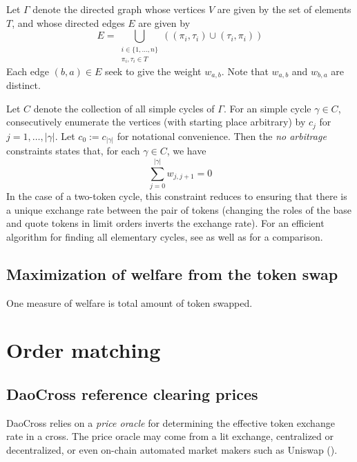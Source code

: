 \documentclass[11pt, reqno]{amsart}
\theoremstyle{definition}
\theoremstyle{remark}
\begin{document}
Let $\Gamma$ denote the directed graph whose vertices $V$ are given by the set
of elements $T$, and whose directed edges $E$ are given by
\[
    E = \bigcup_{\substack{i \in \{1, \ldots, n\} \\ \pi_i, \tau_i \in T}}
    \left( (\pi_i, \tau_i) \cup (\tau_i, \pi_i) \right)
\]
Each edge $(b, a) \in E$ seek to give the weight $w_{a, b}$. Note that
$w_{a, b}$ and $w_{b, a}$ are distinct.

Let $C$ denote the collection of all simple cycles of $\Gamma$.
For an simple cycle $\gamma \in C$, consecutively enumerate the vertices
(with starting place arbitrary) by $c_j$ for $j = 1, \ldots, |\gamma|$.
Let $c_0 := c_{|\gamma|}$ for notational convenience. Then
the \emph{no arbitrage} constraints states that, for each $\gamma \in C$, we have
\[
    \sum_{j = 0}^{|\gamma|} w_{j, j + 1} = 0
\]
In the case of a two-token cycle, this constraint reduces to ensuring that
there is a unique exchange rate between the pair of tokens (changing the roles
of the base and quote tokens in limit orders inverts the exchange rate).
For an efficient algorithm for finding all elementary cycles, see \cite{Jo75}
as well as \cite{MaDe76} for a comparison.

\subsection{Maximization of welfare from the token swap}

One measure of welfare is total amount of token swapped.

\section{Order matching}

\subsection{DaoCross reference clearing prices}
DaoCross relies on a \emph{price oracle} for determining the effective
token exchange rate in a cross. The price oracle may come from a lit
exchange, centralized or decentralized, or even on-chain automated market
makers such as Uniswap (\cite[\S 2.2]{AdZiRo20}).
\end{document}

